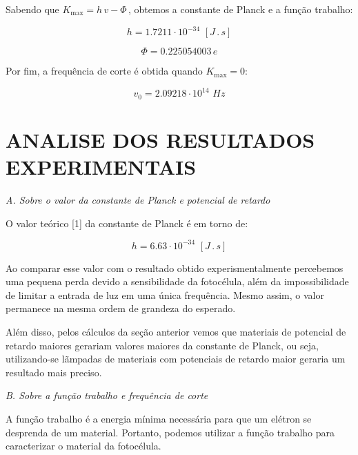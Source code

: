 \documentclass[10pt,twocolumn,letterpaper]{article}
\begin{document}
\hspace{1cm} Sabendo que $K_{\max} = h\,v - \Phi\,$, obtemos a constante de
Planck e a função trabalho:

\begin{equation*}
    h = 1.7211\cdot 10^{-34} \,\, [J\,.\,s]
\end{equation*}

\begin{equation*}
    \Phi = 0.225054003\,e
\end{equation*}

\noindent Por fim, a frequência de corte é obtida quando $K_{\max} = 0$:

\begin{equation*}
    v_0 = 2.09218 \cdot 10^{14} \,\, Hz
\end{equation*}


\section{ANALISE DOS RESULTADOS EXPERIMENTAIS}

\noindent\textit{A. Sobre o valor da constante de Planck e potencial de
retardo}

\noindent O valor teórico [1] da constante de Planck é em torno de:

\begin{equation*}
    h = 6.63 \cdot 10^{-34} \,\, [J\,.\,s]
\end{equation*}

\hspace{1cm} Ao comparar esse valor com o resultado obtido experismentalmente percebemos uma pequena perda devido a sensibilidade da fotocélula, além da impossibilidade de limitar a entrada de luz em uma única frequência. Mesmo assim, o valor permanece na mesma ordem de grandeza do esperado.

\hspace{1cm} Além disso, pelos cálculos da seção anterior vemos que materiais de potencial de retardo maiores gerariam valores maiores da constante de Planck, ou seja, utilizando-se lãmpadas de materiais com potenciais de retardo maior geraria um resultado mais preciso.

\noindent\textit{B. Sobre a função trabalho e frequência de corte}

\hspace{1cm} A função trabalho é a energia mínima necessária para que um elétron se desprenda de um material. Portanto, podemos utilizar a função trabalho para caracterizar o material da fotocélula.
\end{document}
